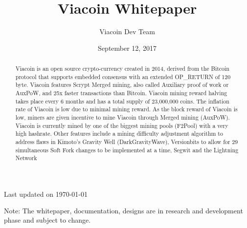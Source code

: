 \documentclass{article}
\author{Viacoin Dev Team}
\title{Viacoin Whitepaper}
\date{September 12, 2017}
\begin{document}
\maketitle

{\normalfont
      Last updated on \today}

\begin{abstract}\noindent
\normalsize Viacoin is an open source crypto-currency created in 2014,
derived from the \cite{bitcoin2008}Bitcoin protocol that supports embedded consensus with an
extended OP\_RETURN of 120 byte. Viacoin features Scrypt Merged mining,
also called Auxiliary proof of work or AuxPoW, and 25x faster transactions than Bitcoin.
Viacoin mining reward halving takes place every 6 months and has a total supply of
23,000,000 coins. The inflation rate of Viacoin is low due to minimal mining reward. As the block 
reward of Viacoin is low, miners are given incentive to mine Viacoin through Merged mining (AuxPoW).
Viacoin is currently mined by one of the biggest mining pools
(F2Pool) with a very high hashrate.
\linebreak
\noindent Other features include a mining difficulty adjustment algorithm to address flaws in Kimoto’s Gravity Well (DarkGravityWave),
Versionbits to allow for 29 simultaneous Soft Fork changes to be implemented at a time, Segwit and the Lightning Network
\end{abstract}


\vfill \noindent
\small Note: The whitepaper, documentation, designs are in research and development phase and subject to change.
\newpage

\normalsize
\end{document}
